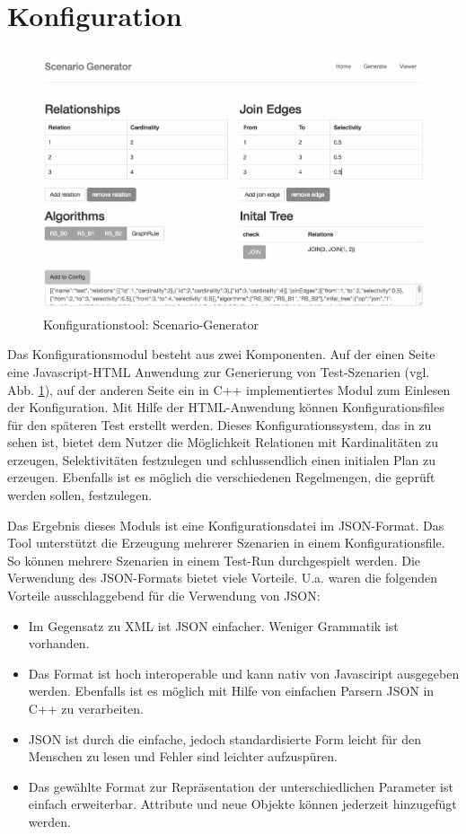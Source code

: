 \section{Konfiguration}


\begin{figure}[ht]
  \centering
  \includegraphics[width=1\textwidth]{04_Implementierung/00_media/Tool.png}
  \caption{Konfigurationstool: Scenario-Generator}
  \label{ScenarioGenerator}
\end{figure}

Das Konfigurationsmodul besteht aus zwei Komponenten. Auf der einen Seite eine Javascript-HTML Anwendung zur Generierung von Test-Szenarien (vgl. Abb. \ref{ScenarioGenerator}), auf der anderen Seite ein in C++ implementiertes Modul zum Einlesen der Konfiguration. Mit Hilfe der HTML-Anwendung können Konfigurationsfiles für den späteren Test erstellt werden. Dieses Konfigurationssystem, das in  zu sehen ist, bietet dem Nutzer die Möglichkeit Relationen mit Kardinalitäten zu erzeugen, Selektivitäten festzulegen und schlussendlich einen initialen Plan zu erzeugen. Ebenfalls ist es möglich die verschiedenen Regelmengen, die geprüft werden sollen, festzulegen.

Das Ergebnis dieses Moduls ist eine Konfigurationsdatei im JSON-Format. Das Tool unterstützt die Erzeugung mehrerer Szenarien in einem Konfigurationsfile. So können mehrere Szenarien in einem Test-Run durchgespielt werden. Die Verwendung des JSON-Formats bietet viele Vorteile. U.a. waren die folgenden Vorteile ausschlaggebend für die Verwendung von JSON:

\begin{itemize}
\item Im Gegensatz zu XML ist JSON einfacher. Weniger Grammatik ist vorhanden.
\item Das Format ist hoch interoperable und kann nativ von Javasciript ausgegeben werden. Ebenfalls ist es möglich mit Hilfe von einfachen Parsern JSON in C++ zu verarbeiten.
\item JSON ist durch die einfache, jedoch standardisierte Form leicht für den Menschen zu lesen und Fehler sind leichter aufzuspüren.
\item Das gewählte Format zur Repräsentation der unterschiedlichen Parameter ist einfach erweiterbar. Attribute und neue Objekte können jederzeit hinzugefügt werden.
\end{itemize}

